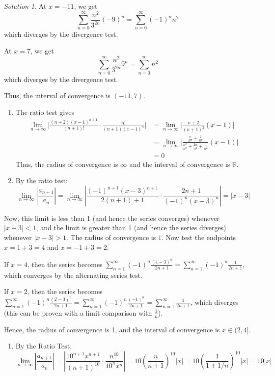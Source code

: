 \documentclass[
]{book}
\providecommand{\tightlist}{%
  \setlength{\itemsep}{0pt}\setlength{\parskip}{0pt}}
\theoremstyle{definition}
\theoremstyle{definition}
\theoremstyle{definition}
\theoremstyle{definition}
\theoremstyle{remark}
\newtheorem*{solution}{Solution}
\begin{document}
\begin{solution}
At \(x=-11\), we get \[ \sum_{n=0}^{\infty}\frac{n^2}{3^{2n}}(-9)^n=\sum_{n=0}^{\infty}(-1)^nn^2\]
which diverges by the divergence test.

At \(x=7\), we get \[ \sum_{n=0}^{\infty}\frac{n^2}{3^{2n}}9^n= \sum_{n=0}^{\infty}n^2\]
which diverges by the divergence test.

Thus, the interval of convergence is \((-11,7)\).

\begin{enumerate}
\def\labelenumi{\arabic{enumi}.}
\setcounter{enumi}{2}
\item
  The ratio test gives
  \begin{align*}
  \lim_{n\to \infty}\Bigg| \frac{(n+2)(x-1)^{n+1}}{(n+1)!}\cdot \frac{n!}{(n+1)(x-1)^n}\Bigg|&=\lim_{n\to\infty}\Bigg| \frac{n+2}{(n+1)^2}(x-1)\Bigg|\\
  &=\lim_{n\to\infty}\Bigg| \frac{\frac{n}{n^2}+\frac{2}{n^2}}{\frac{n^2}{n^2}+\frac{2n}{n^2}+\frac{1}{n^2}}(x-1)\Bigg|\\
  &=0
  \end{align*}
  Thus, the radius of convergence is \(\infty\) and the interval of convergence is \(\mathbb{R}\).
\item
  By the ratio test: \[ \lim_{n\to\infty}\left|\frac{a_{n+1}}{a_n}\right| =
  \lim_{n\to\infty}\left|\frac{(-1)^{n+1}(x-3)^{n+1}}{2(n+1)+1}\cdot\frac{2n+1}{(-1)^n(x-3)^n}\right| =  |x-3| \]
\end{enumerate}

Now, this limit is less than 1 (and hence the series converges) whenever \(|x-3|<1\), and the limit is greater than
1 (and hence the series diverges) whenever \(|x-3|>1\). The radius of convergence is \(1\). Now test the endpoints
\(x = 1+3=4\) and \(x = -1+3 = 2\).

If \(x = 4\), then the series becomes \(\displaystyle{\sum_{n=1}^\infty (-1)^n \frac{(4-3)^n}{2n+1} = \sum_{n=1}^\infty (-1)^n \frac{1}{2n+1}}\), which converges by the alternating series test.

If \(x = 2\), then the series becomes \(\displaystyle{\sum_{n=1}^\infty (-1)^n \frac{(2-3)^n}{2n+1} = \sum_{n=1}^\infty (-1)^n \frac{(-1)^n}{2n+1}} = \displaystyle{ \sum_{n=1}^\infty \frac{1}{2n+1}}\), which
diverges (this can be proven with a limit comparison with \(\frac{1}{n}\)).

Hence, the radius of convergence is 1, and the interval of convergence is \(x\in(2,4]\).

\begin{enumerate}
\def\labelenumi{\arabic{enumi}.}
\setcounter{enumi}{4}
\tightlist
\item
  By the Ratio Test: \[ \lim_{n\to\infty} \left|\frac{a_{n+1}}{a_n}\right| = \left|\frac{10^{n+1}
  x^{n+1}}{(n+1)^{10}}\cdot \frac{n^{10}}{10^n x^n}\right| = 10 \left(\frac{n}{n+1}\right)^{10} |x| = 10
  \left(\frac{1}{1+1/n}\right)^{10} |x| = 10|x| \]
\end{enumerate}


\end{solution}
\end{document}
